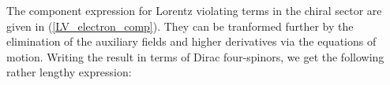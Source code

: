 \documentclass[12pt]{revtex4}
\begin{document}
The component expression for Lorentz violating terms in the chiral sector are given
in (\ref{LV_electron_comp}). They can be tranformed further 
by the elimination of the auxiliary fields and higher derivatives 
via the equations of motion. Writing the result in terms of Dirac
four-spinors, we get the following rather lengthy expression:
\end{document}
